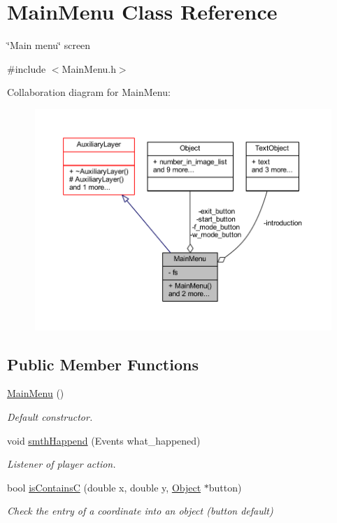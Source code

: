 \hypertarget{class_main_menu}{}\section{Main\+Menu Class Reference}
\label{class_main_menu}


\char`\"{}\+Main menu\char`\"{} screen  




{\ttfamily \#include $<$Main\+Menu.\+h$>$}



Collaboration diagram for Main\+Menu\+:\nopagebreak
\begin{figure}[H]
\begin{center}
\leavevmode
\includegraphics[width=350pt]{class_main_menu__coll__graph}
\end{center}
\end{figure}
\subsection*{Public Member Functions}
\begin{DoxyCompactItemize}
\item 
\mbox{\label{class_main_menu_a53eecf9d5ffd094f54ac4193e7e57eaf}} 
\hyperlink{class_main_menu_a53eecf9d5ffd094f54ac4193e7e57eaf}{Main\+Menu} ()
\begin{DoxyCompactList}\small\item\em Default constructor. \end{DoxyCompactList}\item 
void \hyperlink{class_main_menu_aa4272e1cb2c70c23c869d301f2dd2110}{smth\+Happend} (Events what\+\_\+happened)
\begin{DoxyCompactList}\small\item\em Listener of player action. \end{DoxyCompactList}\item 
bool \hyperlink{class_main_menu_a9b8bc5319e82474ecc03ae19b52c4293}{is\+ContainsC} (double x, double y, \hyperlink{class_object}{Object} $\ast$button)
\begin{DoxyCompactList}\small\item\em Check the entry of a coordinate into an object (button default) \end{DoxyCompactList}\end{DoxyCompactItemize}
